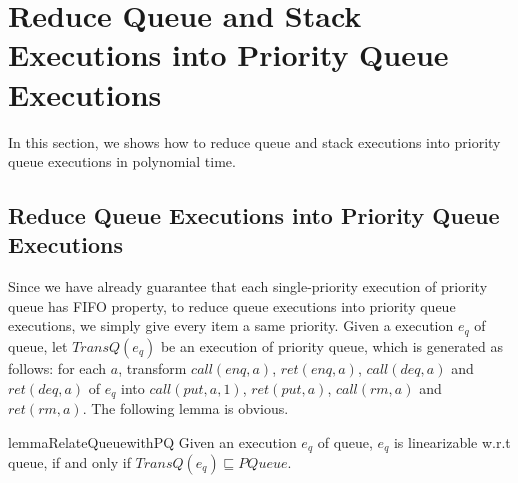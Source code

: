 \section{Reduce Queue and Stack Executions into Priority Queue Executions}
\label{sec:reduce queue and stack executions into priority queue executions}

In this section, we shows how to reduce queue and stack executions into priority queue executions in polynomial time. 


\subsection{Reduce Queue Executions into Priority Queue Executions}
\label{subsec:reduce queue executions into priority queue executions} 

Since we have already guarantee that each single-priority execution of priority queue has FIFO property, to reduce queue executions into priority queue executions, we simply give every item a same priority. Given a execution $e_q$ of queue, let $\textit{TransQ}(e_q)$ be an execution of priority queue, which is generated as follows: for each $a$, transform $\textit{call}(\textit{enq},a)$, $\textit{ret}(\textit{enq},a)$, $\textit{call}(\textit{deq},a)$ and $\textit{ret}(\textit{deq},a)$ of $e_q$ into $\textit{call}(\textit{put},a,1)$, $\textit{ret}(\textit{put},a)$, $\textit{call}(\textit{rm},a)$ and $\textit{ret}(\textit{rm},a)$. The following lemma is obvious. 

\begin{restatable}{lemma}{RelateQueuewithPQ}
\label{lemma:relate queue with priority queue}
Given an execution $e_q$ of queue, $e_q$ is linearizable w.r.t queue, if and only if $\textit{TransQ}(e_q) \sqsubseteq \textit{PQueue}$.
\end{restatable} 